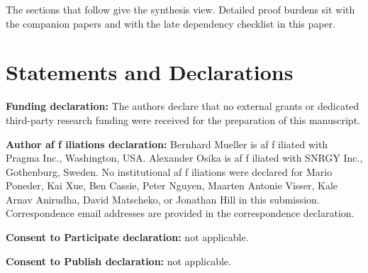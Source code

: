 \documentclass[11pt]{article}
\begin{document}
The sections that follow give the synthesis view. Detailed proof burdens sit with the companion
papers and with the late dependency checklist in this paper.

\def\OPHSkipEmbeddedReferences{1}



\appendix



\section*{Statements and Declarations}

\noindent\textbf{Funding declaration:} The authors declare that no external grants or dedicated
third-party research funding were received for the preparation of this manuscript.

\noindent\textbf{Author af\kern0pt f\kern0pt iliations declaration:} Bernhard Mueller is af\kern0pt f\kern0pt iliated with
Pragma Inc., Washington, USA. Alexander Osika is af\kern0pt f\kern0pt iliated with SNRGY Inc.,
Gothenburg, Sweden. No institutional af\kern0pt f\kern0pt iliations were declared for Mario Poneder, Kai
Xue, Ben Cassie, Peter Nguyen, Maarten Antonie Visser, Kale Arnav Anirudha, David Matscheko, or
Jonathan Hill in this submission.
Correspondence email addresses are provided in the correspondence declaration.

\noindent\textbf{Consent to Participate declaration:} not applicable.

\noindent\textbf{Consent to Publish declaration:} not applicable.
\end{document}
